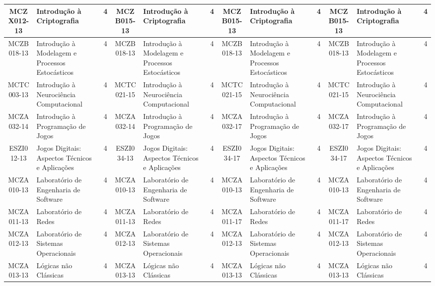 \begin{landscape}
{\begin{longtable}{|c|p{.2\textheight}|c||c|p{.2\textheight}|c||c|p{.2\textheight}|c||c|p{.2\textheight}|c|}
MCZX012-13 & Introdução à Criptografia & 4 &
MCZB015-13 & Introdução à Criptografia & 4 &
MCZB015-13 & Introdução à Criptografia & 4 & 
MCZB015-13 & Introdução à Criptografia & 4\\ \hline

MCZB018-13 & Introdução à Modelagem e Processos Estocásticos & 4 &
MCZB018-13 & Introdução à Modelagem e Processos Estocásticos & 4 &
MCZB018-13 & Introdução à Modelagem e Processos Estocásticos & 4 &
MCZB018-13 & Introdução à Modelagem e Processos Estocásticos & 4\\ \hline

MCTC003-13 & Introdução à Neurociência Computacional & 4 &
MCTC021-15 & Introdução à Neurociência Computacional & 4 &
MCTC021-15 & Introdução à Neurociência Computacional & 4 & 
MCTC021-15 & Introdução à Neurociência Computacional & 4\\ \hline

MCZA032-14 & Introdução à Programação de Jogos & 4 &
MCZA032-14 & Introdução à Programação de Jogos & 4 &
MCZA032-17 & Introdução à Programação de Jogos & 4 &
MCZA032-17 & Introdução à Programação de Jogos & 4\\ \hline

ESZI012-13 & Jogos Digitais: Aspectos Técnicos e Aplicações & 4 &
ESZI034-13 & Jogos Digitais: Aspectos Técnicos e Aplicações & 4 &
ESZI034-17 & Jogos Digitais: Aspectos Técnicos e Aplicações & 4 &
ESZI034-17 & Jogos Digitais: Aspectos Técnicos e Aplicações & 4\\ \hline

MCZA010-13 & Laboratório de Engenharia de Software & 4 &
MCZA010-13 & Laboratório de Engenharia de Software & 4 &
MCZA010-13 & Laboratório de Engenharia de Software & 4 &
MCZA010-13 & Laboratório de Engenharia de Software & 4\\ \hline

MCZA011-13 & Laboratório de Redes & 4 &
MCZA011-13 & Laboratório de Redes & 4 &
MCZA011-17 & Laboratório de Redes & 4 &
MCZA011-17 & Laboratório de Redes & 4\\ \hline

MCZA012-13 & Laboratório de Sistemas Operacionais & 4 &
MCZA012-13 & Laboratório de Sistemas Operacionais & 4 &
MCZA012-13 & Laboratório de Sistemas Operacionais & 4 & 
MCZA012-13 & Laboratório de Sistemas Operacionais & 4\\ \hline

MCZA013-13 & Lógicas não Clássicas & 4 &
MCZA013-13 & Lógicas não Clássicas & 4 &
MCZA013-13 & Lógicas não Clássicas & 4 &
MCZA013-13 & Lógicas não Clássicas & 4\\ \hline


\end{longtable}}
\end{landscape}
